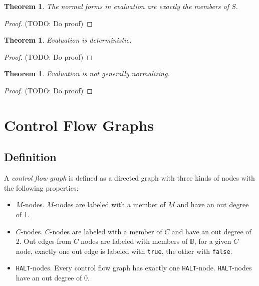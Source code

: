 \documentclass[11pt]{article}
\begin{document}
\newtheorem*{evalnormalforms}{Theorem}
\begin{evalnormalforms}
The normal forms in evaluation are exactly the members of $S$.
\end{evalnormalforms}

\begin{proof}
(TODO: Do proof)
\end{proof}

\newtheorem*{evaldeterminism}{Theorem}
\begin{evaldeterminism}
Evaluation is deterministic.
\end{evaldeterminism}

\begin{proof}
(TODO: Do proof)
\end{proof}

\newtheorem*{evalnotnormalizing}{Theorem}
\begin{evalnotnormalizing}
Evaluation is not generally normalizing.
\end{evalnotnormalizing}

\begin{proof}
(TODO: Do proof)
\end{proof}

\section{Control Flow Graphs}

\subsection{Definition}

A \emph{control flow graph} is defined as a directed graph with three kinds of nodes with the following properties:

\begin{itemize}
\item $M$-nodes.  $M$-nodes are labeled with a member of $M$ and have an out degree of 1.
\item $C$-nodes.  $C$-nodes are labeled with a member of $C$ and have an out degree of 2.  Out edges from $C$ nodes are labeled with members of $\mathbb{B}$, for a given $C$ node, exactly one out edge is labeled with \texttt{true}, the other with \texttt{false}.
\item \texttt{HALT}-nodes.  Every control flow graph has exactly one \texttt{HALT}-node.  \texttt{HALT}-nodes have an out degree of 0.
\end{itemize}
\end{document}
